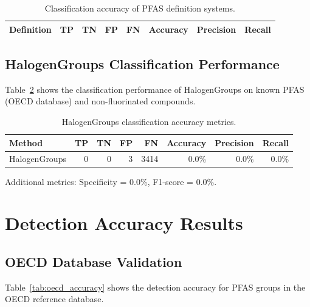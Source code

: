 \begin{table}[htbp]
\centering
\caption{Classification accuracy of PFAS definition systems.}
\label{tab:definitions_accuracy}
\begin{tabular}{lrrrrrrr}
\toprule
\rowcolor[HTML]{D6E4F5}\textbf{Definition} & \textbf{TP} & \textbf{TN} & \textbf{FP} & \textbf{FN} & \textbf{Accuracy} & \textbf{Precision} & \textbf{Recall} \\
\midrule
\bottomrule
\end{tabular}
\end{table}

\subsection*{HalogenGroups Classification Performance}

Table~\ref{tab:HalogenGroups_accuracy} shows the classification performance of HalogenGroups on known PFAS (OECD database) and non-fluorinated compounds.

\begin{table}[htbp]
\centering
\caption{HalogenGroups classification accuracy metrics.}
\label{tab:HalogenGroups_accuracy}
\begin{tabular}{lrrrrrrr}
\toprule
\rowcolor[HTML]{D6E4F5}\textbf{Method} & \textbf{TP} & \textbf{TN} & \textbf{FP} & \textbf{FN} & \textbf{Accuracy} & \textbf{Precision} & \textbf{Recall} \\
\midrule
\rowcolor[HTML]{FAEADE}HalogenGroups & 0 & 0 & 3 & 3414 & 0.0\% & 0.0\% & 0.0\% \\
\bottomrule
\end{tabular}
\end{table}

Additional metrics: Specificity = 0.0\%, F1-score = 0.0\%.

\section*{Detection Accuracy Results}

\subsection*{OECD Database Validation}

Table~\ref{tab:oecd_accuracy} shows the detection accuracy for PFAS groups in the OECD reference database.

